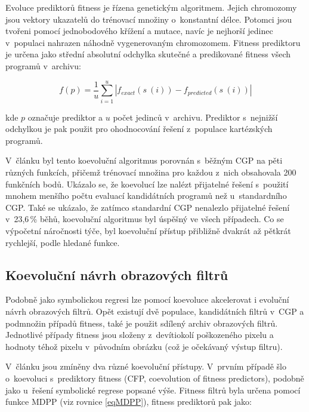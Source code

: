 Evoluce prediktorů fitness je řízena genetickým algoritmem. Jejich chromozomy jsou vektory ukazatelů do trénovací množiny o~konstantní délce. Potomci jsou tvořeni pomocí jednobodového křížení a mutace, navíc je nejhorší jedinec v~populaci nahrazen náhodně vygenerovaným chromozomem. Fitness prediktoru je určena jako střední absolutní odchylka skutečné a predikované fitness všech programů v~archivu:

\begin{equation}
    \label{eqFpredictorSR}
    f \left( p \right) = \frac{1}{u} \sum\limits_{i=1}^{u} \left| f_{\mathit{exact}} \left( s~\left( i \right) \right) - f_{\mathit{predicted}} \left( s~\left( i \right) \right) \right|
\end{equation}

\noindent{}kde $p$ označuje prediktor a $u$ počet jedinců v~archivu. Prediktor s~nejnižší odchylkou je pak použit pro ohodnocování řešení z~populace kartézských programů.

V~článku \cite{SikuEuroGP} byl tento koevoluční algoritmus porovnán s~běžným CGP na pěti různých funkcích, přičemž trénovací množina pro každou z~nich obsahovala 200 funkčních bodů. Ukázalo se, že koevolucí lze nalézt přijatelné řešení s~použití mnohem menšího počtu evaluací kandidátních programů než u~standardního CGP. Také se ukázalo, že zatímco standardní CGP nenalezlo přijatelné řešení v~23,6\,\% běhů, koevoluční algoritmus byl úspěšný ve všech případech. Co se výpočetní náročnosti týče, byl koevoluční přístup přibližně dvakrát až pětkrát rychlejší, podle hledané funkce.


\subsection{Koevoluční návrh obrazových filtrů}
\label{secCoevIF}

Podobně jako symbolickou regresi lze pomocí koevoluce akcelerovat i evoluční návrh obrazových filtrů. Opět existují dvě populace, kandidátních filtrů v~CGP a podmnožin případů fitness, také je použit sdílený archiv obrazových filtrů. Jednotlivé případy fitness jsou složeny z~devítiokolí poškozeného pixelu a hodnoty téhož pixelu v~původním obrázku (což je očekávaný výstup filtru).

V~článku \cite{SikuPPSN} jsou zmíněny dva různé koevoluční přístupy. V~prvním případě šlo o~koevoluci s~prediktory fitness (CFP, coevolution of fitness predictors), podobně jako u~řešení symbolické regrese popsané výše. Fitness filtrů byla určena pomocí funkce MDPP (viz rovnice \ref{eqMDPP}), fitness prediktorů pak jako:

